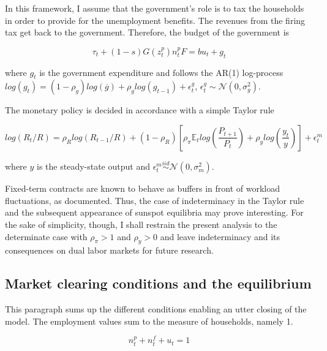 \documentclass[a4paper]{article}
\begin{document}
In this framework, I assume that the government's role is to tax the households in order to provide for the unemployment benefits. The revenues from the firing tax get back to the government.  Therefore, the budget of the government is

\begin{equation}
\tau_t + (1-s) G\left( z_t^p \right) n_t^p F = b u_t + g_t
\end{equation}

where $g_t$ is the government expenditure and follows the AR(1) log-process $log\left(g_t\right) = \left(1-\rho_g\right) log\left(\overline{g}\right) + \rho_g log\left( g_{t-1} \right) + \epsilon_t^g$, $\epsilon_t^g \sim \mathcal{N} \left( 0, \sigma_g^2 \right)$.

The monetary policy is decided in accordance with a simple Taylor rule

\begin{equation}
log\left( R_{t} / R \right) = \rho_R log\left( R_{t-1} / R\right) + \left( 1 - \rho_R \right) \left[ \rho_{\pi} \mathbb{E}_t log \left( \frac{P_{t+1}}{P_t} \right) + \rho_y log\left(\frac{y_t}{y}\right) \right] + \epsilon_t^m \label{taylor}
\end{equation}

where $y$ is the steady-state output and $\epsilon_t^m \overset{iid}{\sim} \mathcal{N} \left( 0, \sigma_m^2 \right)$.

Fixed-term contracts are known to behave as buffers in front of workload fluctuations, as \citet{saint1996dual} documented. Thus, the case of indeterminacy in the Taylor rule and the subsequent appearance of sunspot equilibria may prove interesting. For the sake of simplicity, though, I shall restrain the present analysis to the determinate case with $\rho_{\pi} > 1$ and $\rho_y > 0$ and leave indeterminacy and its consequences on dual labor markets for future research.

\subsection{Market clearing conditions and the equilibrium}

This paragraph sums up the different conditions enabling an utter closing of the model. The employment values sum to the measure of households, namely 1.

\begin{equation}
n_t^p + n_t^f + u_t = 1
\end{equation}
\end{document}
